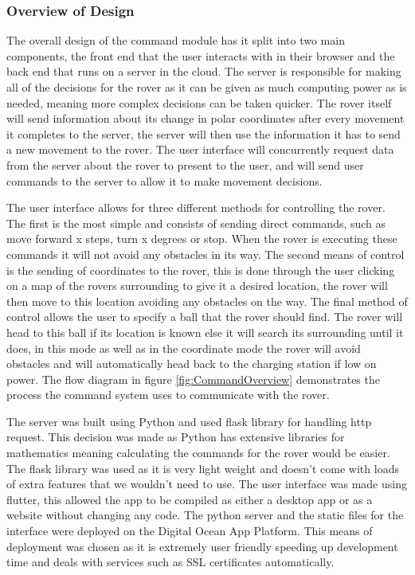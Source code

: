 \documentclass[10pt,twoside]{article}
\begin{document}
\subsubsection{Overview of Design}
The overall design of the command module has it split into two main components, the front end that the user interacts with in their browser and the back end that runs on a server in the cloud. The server is responsible for making all of the decisions for the rover as it can be given as much computing power as is needed, meaning more complex decisions can be taken quicker. The rover itself will send information about its change in polar coordinates after every movement it completes to the server, the server will then use the information it has to send a new movement to the rover. The user interface will concurrently request data from the server about the rover to present to the user, and will send user commands to the server to allow it to make movement decisions. 

The user interface allows for three different methods for controlling the rover. The first is the most simple and consists of sending direct commands, such as move forward x steps, turn x degrees or stop. When the rover is executing these commands it will not avoid any obstacles in its way. The second means of control is the sending of coordinates to the rover, this is done through the user clicking on a map of the rovers surrounding to give it a desired location, the rover will then move to this location avoiding any obstacles on the way. The final method of control allows the user to specify a ball that the rover should find. The rover will head to this ball if its location is known else it will search its surrounding until it does, in this mode as well as in the coordinate mode the rover will avoid obstacles and will automatically head back to the charging station if low on power. The flow diagram in figure \ref{fig:CommandOverview} demonstrates the process the command system uses to communicate with the rover.

The server was built using Python and used flask library for handling http request. This decision was made as Python has extensive libraries for mathematics meaning calculating the commands for the rover would be easier. The flask library was used as it is very light weight and doesn't come with loads of extra features that we wouldn't need to use. The user interface was made using flutter, this allowed the app to be compiled as either a desktop app or as a website without changing any code. The python server and the static files for the interface were deployed on the Digital Ocean App Platform. This means of deployment was chosen as it is extremely user friendly speeding up development time and deals with services such as SSL certificates automatically.
\end{document}
